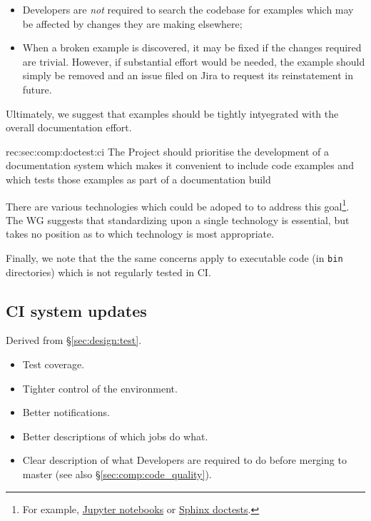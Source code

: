 \begin{itemize}
    \item{Developers are \textit{not} required to search the codebase for examples which may be affected by changes they are making elsewhere;}
    \item{
        When a broken example is discovered, it may be fixed if the changes required are trivial.
        However, if substantial effort would be needed, the example should simply be removed and an issue filed on Jira to request its reinstatement in future.
    }
\end{itemize}

Ultimately, we suggest that examples should be tightly intyegrated with the overall documentation effort.


\begin{recommendation}
    {rec:sec:comp:doctest:ci}
    {The Project should prioritise the development of a documentation system which makes it convenient to include code examples and which tests those examples as part of a documentation build}
\end{recommendation}

There are various technologies which could be adoped to to address this goal\footnote{For example, \href{https://jupyter.org/}{Jupyter notebooks} or \href{http://www.sphinx-doc.org/en/stable/ext/doctest.html}{Sphinx doctests}.}.
The WG suggests that standardizing upon a single technology is essential, but takes no position as to which technology is most appropriate.

Finally, we note that the the same concerns apply to executable code (in \texttt{bin} directories) which is not regularly tested in CI.

\subsection{CI system updates}
\label{sec:comp:ci}

Derived from \S\ref{sec:design:test}.


\begin{itemize}

  \item{Test coverage.}
  \item{Tighter control of the environment.}
  \item{Better notifications.}
  \item{Better descriptions of which jobs do what.}
  \item{Clear description of what Developers are required to do before merging
  to master (see also \S\ref{sec:comp:code_quality}).}

\end{itemize}






